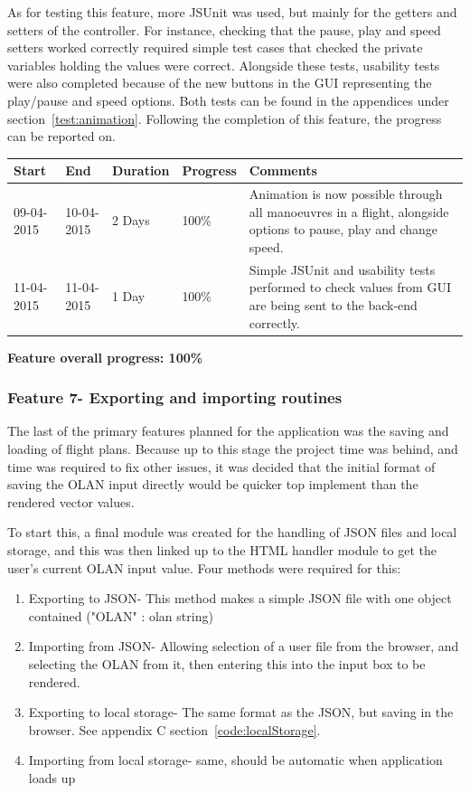As for testing this feature, more JSUnit was used, but mainly for the getters and setters of the controller. For instance, checking that the pause, play and speed setters worked correctly required simple test cases that checked the private variables holding the values were correct. Alongside these tests, usability tests were also completed because of the new buttons in the GUI representing the play/pause and speed options. Both tests can be found in the appendices under section~\ref{test:animation}. Following the completion of this feature, the progress can be reported on. 

\begin{table}[h]
\begin{tabular}{|l|l|l|l|p{7cm}|}
\hline
\textbf{Start} & \textbf{End} & \textbf{Duration} & \textbf{Progress} & \textbf{Comments}                                                                                                     \\ \hline
09-04-2015     & 10-04-2015   & 2 Days            & 100\%             &  Animation is now possible through all manoeuvres in a flight, alongside options to pause, play and change speed.\\ \hline
11-04-2015     & 11-04-2015   & 1 Day            & 100\%             &  Simple JSUnit and usability tests performed to check values from GUI are being sent to the back-end correctly.\\ \hline
\end{tabular}
\end{table}

\textbf{Feature overall progress: 100\%}

\subsubsection{Feature 7- Exporting and importing routines}
The last of the primary features planned for the application was the saving and loading of flight plans. Because up to this stage the project time was behind, and time was required to fix other issues, it was decided that the initial format of saving the OLAN input directly would be quicker top implement than the rendered vector values. 

To start this, a final module was created for the handling of JSON files and local storage, and this was then linked up to the HTML handler module to get the user's current OLAN input value. Four methods were required for this:
\begin{enumerate}
	\item Exporting to JSON- This method makes a simple JSON file with one object contained ("OLAN" : olan string)
	\item Importing from JSON- Allowing selection of a user file from the browser, and selecting the OLAN from it, then entering this into the input box to be rendered.
	\item Exporting to local storage- The same format as the JSON, but saving in the browser. See appendix C section~\ref{code:localStorage}.
	\item Importing from local storage- same, should be automatic when application loads up
\end{enumerate}

